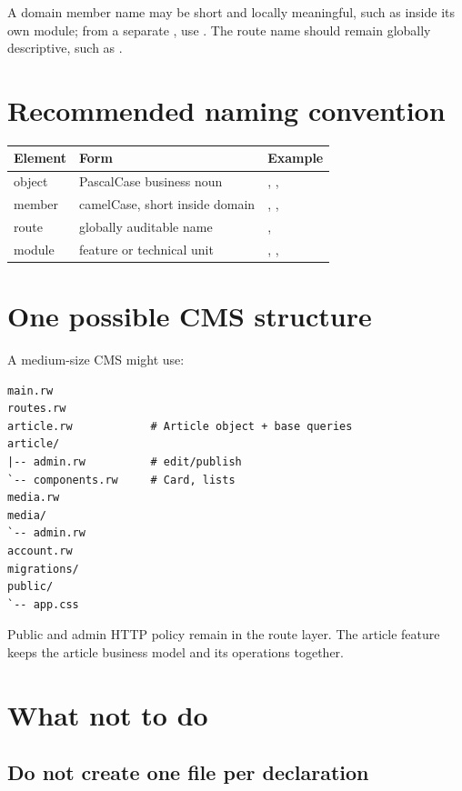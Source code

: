 A domain member name may be short and locally meaningful, such as  inside its own module; from a separate , use . The route name should remain globally descriptive, such as .

\section{Recommended naming convention}

\begin{center}
\begin{tabularx}{\textwidth}{@{}l l Y@{}}
\toprule
\textbf{Element} & \textbf{Form} & \textbf{Example} \\
\midrule
object & PascalCase business noun & , ,  \\
member & camelCase, short inside domain & , ,  \\
route & globally auditable name & ,  \\
module & feature or technical unit & , ,  \\
\bottomrule
\end{tabularx}
\end{center}

\section{One possible CMS structure}

A medium-size CMS might use:

\begin{lstlisting}
main.rw
routes.rw
article.rw            # Article object + base queries
article/
|-- admin.rw          # edit/publish
`-- components.rw     # Card, lists
media.rw
media/
`-- admin.rw
account.rw
migrations/
public/
`-- app.css
\end{lstlisting}

Public and admin HTTP policy remain in the route layer. The article feature keeps the article business model and its operations together.

\section{What not to do}

\subsection*{Do not create one file per declaration}


